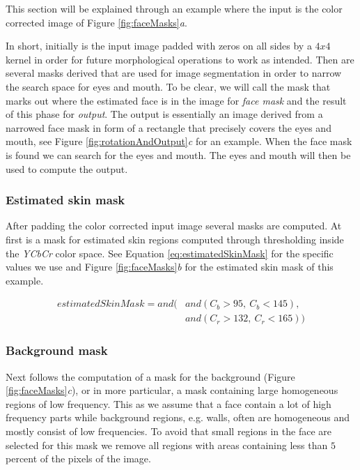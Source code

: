 This section will be explained through an example where the input is the color corrected image of Figure \ref{fig:faceMasks}\textit{a}.



In short, initially is the input image padded with zeros on all sides by a $4x4$ kernel in order for future morphological operations to work as intended. Then are several masks derived that are used for image segmentation in order to narrow the search space for eyes and mouth. To be clear, we will call the mask that marks out where the estimated face is in the image for \textit{face mask} and the result of this phase for \textit{output}. The output is essentially an image derived from a narrowed face mask in form of a rectangle that precisely covers the eyes and mouth, see Figure \ref{fig:rotationAndOutput}\textit{c} for an example. When the face mask is found we can search for the eyes and mouth. The eyes and mouth will then be used to compute the output. 




\subsubsection{Estimated skin mask}
After padding the color corrected input image several masks are computed. At first is a mask for estimated skin regions computed through thresholding inside the \textit{YCbCr} color space. See Equation \ref{eq:estimatedSkinMask} for the specific values we use and Figure \ref{fig:faceMasks}\textit{b} for the estimated skin mask of this example.

\begin{equation} \label{eq:estimatedSkinMask}
\begin{split}
estimatedSkinMask = and( & and(C_{b}> 95, \ C_{b} < 145), \\
 & and(C_{r} > 132, \ C_{r} < 165))
\end{split}
\end{equation}

\subsubsection{Background mask}
Next follows the computation of a mask for the background (Figure \ref{fig:faceMasks}\textit{c}), or in more particular, a mask containing large homogeneous regions of low frequency. This as we assume that a face contain a lot of high frequency parts while background regions, e.g. walls, often are homogeneous and mostly consist of low frequencies. To avoid that small regions in the face are selected for this mask we remove all regions with areas containing less than $5$ percent of the pixels of the image.

